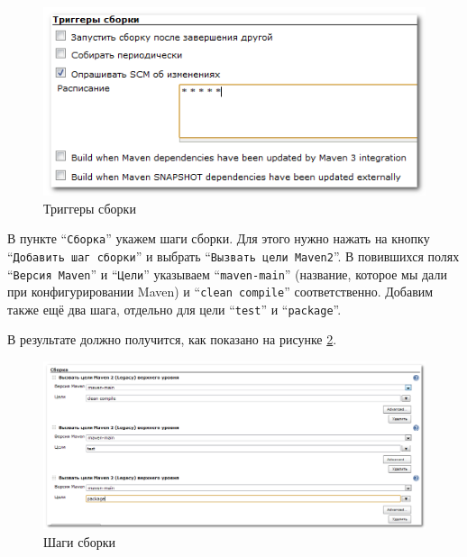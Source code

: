 \documentclass[a4paper,12pt]{article}
\begin{document}
\begin{figure}[htp]
\begin{center}
  \includegraphics[scale = 0.8]{new-job-4.png}
  \caption{Триггеры сборки}
  \label{pic.hudson.job.triggers}
\end{center}
\end{figure}

В пункте ``\texttt{Сборка}'' укажем шаги сборки. Для этого нужно нажать на кнопку ``\texttt{Добавить шаг сборки}'' и
выбрать ``\texttt{Вызвать цели Maven2}''. В повившихся полях ``\texttt{Версия Maven}'' и ``\texttt{Цели}'' указываем
``\texttt{maven-main}'' (название, которое мы дали при конфигурировании Maven) и ``\texttt{clean compile}''
соответственно.
Добавим также ещё два шага, отдельно для цели ``\texttt{test}'' и ``\texttt{package}''.

В результате должно получится, как показано на рисунке \ref{pic.hudson.job.steps}.

\begin{figure}[htp]
\begin{center}
  \includegraphics[scale = 0.6]{new-job-5.png}
  \vspace{-10pt}
  \caption{Шаги сборки}
  \label{pic.hudson.job.steps}
\end{center}
\end{figure}
\end{document}
